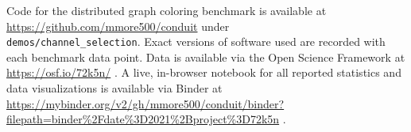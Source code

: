 Code for the distributed graph coloring benchmark is available at \url{https://github.com/mmore500/conduit} under \\ \texttt{demos/channel\_selection}.
Exact versions of software used are recorded with each benchmark data point.
Data is available via the Open Science Framework at \url{https://osf.io/72k5n/} \cite{foster2017open}.
A live, in-browser notebook for all reported statistics and data visualizations is available via Binder at \url{https://mybinder.org/v2/gh/mmore500/conduit/binder?filepath=binder%2Fdate%3D2021%2Bproject%3D72k5n} \cite{jupyter2018binder}.
